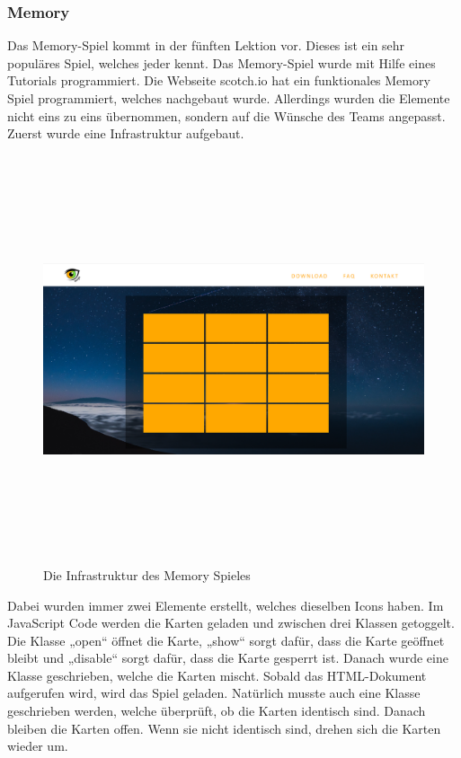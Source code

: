\subsubsection{Memory}
Das Memory-Spiel kommt in der fünften Lektion vor. Dieses ist ein sehr populäres Spiel, welches jeder kennt. Das Memory-Spiel wurde mit Hilfe eines Tutorials programmiert. Die Webseite scotch.io \cite{memorytutorial} hat ein funktionales Memory Spiel programmiert, welches nachgebaut wurde. Allerdings wurden die Elemente nicht eins zu eins übernommen, sondern auf die Wünsche des Teams angepasst. Zuerst wurde eine Infrastruktur aufgebaut. 
\begin{figure} [h]
	\centering
\includegraphics[width=12cm,height=12cm,keepaspectratio]{webseite_memory} 
	\caption{Die Infrastruktur des Memory Spieles}
\end{figure}
Dabei wurden immer zwei Elemente erstellt, welches dieselben Icons haben. Im JavaScript Code werden die Karten geladen und zwischen drei Klassen getoggelt. Die Klasse „open“ öffnet die Karte, „show“ sorgt dafür, dass die Karte geöffnet bleibt und „disable“ sorgt dafür, dass die Karte gesperrt ist. Danach wurde eine Klasse geschrieben, welche die Karten mischt. Sobald das HTML-Dokument aufgerufen wird, wird das Spiel geladen. Natürlich musste auch eine Klasse geschrieben werden, welche überprüft, ob die Karten identisch sind. Danach bleiben die Karten offen. Wenn sie nicht identisch sind, drehen sich die Karten wieder um. 
